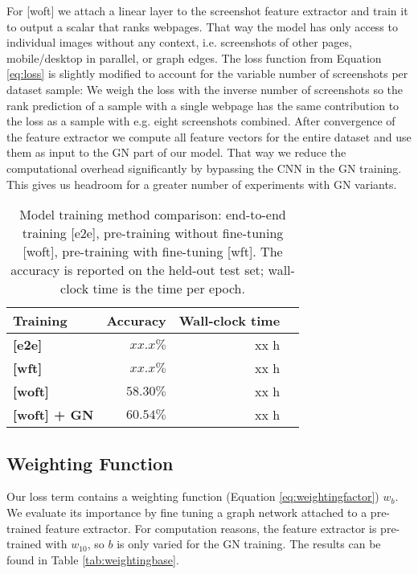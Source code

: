 For [woft] we attach a linear layer to the screenshot feature extractor and train it to output a scalar that ranks webpages. That way the model has only access to individual images without any context, i.e. screenshots of other pages, mobile/desktop in parallel, or graph edges. The loss function from Equation \ref{eq:loss} is slightly modified to account for the variable number of screenshots per dataset sample: We weigh the loss with the inverse number of screenshots so the rank prediction of a sample with a single webpage has the same contribution to the loss as a sample with e.g. eight screenshots combined. After convergence of the feature extractor we compute all feature vectors for the entire dataset and use them as input to the GN part of our model. That way we reduce the computational overhead significantly by bypassing the CNN in the GN training. This gives us headroom for a greater number of experiments with GN variants.

\begin{table}
    \centering
    \begin{tabular}{lrrr}
        \textbf{Training} & \textbf{Accuracy} & \textbf{Wall-clock time}\\\hline
        \textbf{[e2e]} & $xx.x\%$ & xx h\\
        \textbf{[wft]} & $xx.x\%$ & xx h\\
        \textbf{[woft]} & $58.30\%$ & xx h\\
        \textbf{[woft] + GN} & $60.54\%$ & xx h\\
    \end{tabular}
    \caption[Model training method comparison]{Model training method comparison: end-to-end training [e2e], pre-training without fine-tuning [woft], pre-training with fine-tuning [wft]. The accuracy is reported on the held-out test set; wall-clock time is the time per epoch.}
    \label{tab:trainmethodcomparison}
\end{table}

\subsection{Weighting Function}

Our loss term contains a weighting function (Equation \ref{eq:weightingfactor}) $w_b$. We evaluate its importance by fine tuning a graph network attached to a pre-trained feature extractor. For computation reasons, the feature extractor is pre-trained with $w_{10}$, so $b$ is only varied for the GN training. The results can be found in Table \ref{tab:weightingbase}.

